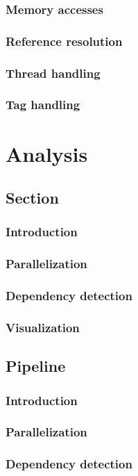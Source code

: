 \subsubsection{Memory accesses}
\subsubsection{Reference resolution}
\subsubsection{Thread handling}
\subsubsection{Tag handling}

\section{Analysis}

\subsection{Section}
\subsubsection{Introduction}
\subsubsection{Parallelization}
\subsubsection{Dependency detection}
\subsubsection{Visualization}

\subsection{Pipeline}
\subsubsection{Introduction}
\subsubsection{Parallelization}
\subsubsection{Dependency detection}
